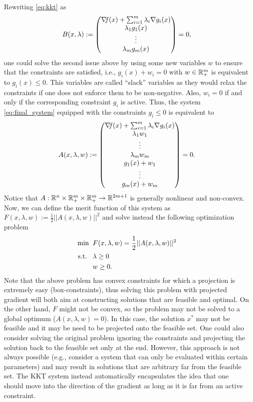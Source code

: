 \documentclass[10pt,a4paper]{article}
\begin{document}
\noindent Rewriting \eqref{eq:kkt} as 
\begin{equation}\label{eq:final_system}
	B (x,\lambda) :=
	\begin{pmatrix}
		\operatorname*{\mathit{\nabla \!f}}(x)+ \sum_{i=1}^{m} \lambda_i \nabla g_i(x)\\
		\lambda_1 g_1(x)\\
		\vdots\\
		\lambda_m g_m(x)\\
	\end{pmatrix}=0,
\end{equation}
one could solve the second issue above by using some new variables $w$ to ensure that the constraints are satisfied, i.e., $g_i(x)+w_i=0$ with $w\in \mathbb{R}^m_+$ is equivalent to $g_i(x)\leq 0$. This variables are called ``slack'' variables as they would relax the constraints if one does not enforce them to be non-negative. Also, $w_i=0$ if and only if the corresponding constraint $g_i$ is active. Thus, the system \eqref{eq:final_system} equipped with the constraints $g_i\leq 0$ is equivalent to 
\begin{equation*}
	A (x,\lambda,w) :=
	\begin{pmatrix}
		\operatorname*{\mathit{\nabla \!f}}(x)+ \sum_{i=1}^{m} \lambda_i \nabla g_i(x)\\
		\lambda_1 w_1\\
		\vdots\\
		\lambda_m w_m\\
		g_1(x) + w_1\\
		\vdots\\
		g_m(x) +w_m\\
	\end{pmatrix}=0.
\end{equation*}
Notice that $A:\mathbb{R}^n\times\mathbb{R}^m_+\times\mathbb{R}^m_+\to \mathbb{R}^{2m+1}$ is generally nonlinear and non-convex. Now, we can define the merit function of this system as $F(x,\lambda,w) := \frac{1}{2}||A(x,\lambda,w)||^2$ and solve instead the following optimization problem
\begin{equation*}
	\begin{split}
		\min \;\; &F(x,\lambda, w)= \frac{1}{2}||A(x,\lambda,w)||^2\\
		\text{s.t.} \;\;\;& \lambda\geq 0\\
		& w\geq 0.
	\end{split}
\end{equation*}
Note that the above problem has convex constraints for which a projection is extremely easy (box-constraints), thus solving this problem with projected gradient will both aim at constructing solutions that are feasible and optimal. On the other hand, $F$ might not be convex, so the problem may not be solved to a global optimum ($A(x,\lambda,w)=0$). In this case, the solution $x^*$ may not be feasible and it may be need to be projected onto the feasible set. One could also consider solving the original problem ignoring the constraints and projecting the solution back to the feasible set only at the end. However, this approach is not always possible (e.g., consider a system that can only be evaluated within certain parameters) and may result in solutions that are arbitrary far from the feasible set. The KKT system instead automatically encapsulates the idea that one should move into the direction of the gradient as long as it is far from an active constraint.
\end{document}

